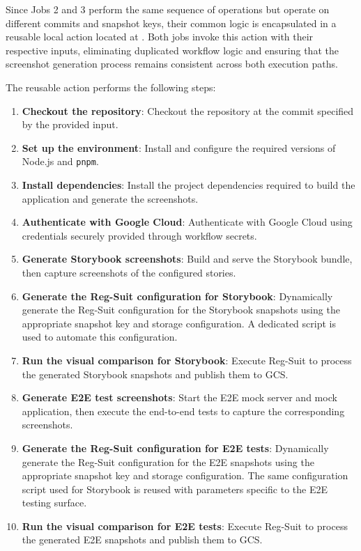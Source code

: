 Since Jobs 2 and 3 perform the same sequence of operations but operate on different commits and snapshot keys, their common logic is encapsulated in a reusable local action located at . Both jobs invoke this action with their respective inputs, eliminating duplicated workflow logic and ensuring that the screenshot generation process remains consistent across both execution paths.

The reusable action performs the following steps:

\begin{enumerate}
    \item \textbf{Checkout the repository}: Checkout the repository at the commit specified by the provided input.

    \item \textbf{Set up the environment}: Install and configure the required versions of Node.js and \texttt{pnpm}.

    \item \textbf{Install dependencies}: Install the project dependencies required to build the application and generate the screenshots.

    \item \textbf{Authenticate with Google Cloud}: Authenticate with Google Cloud using credentials securely provided through workflow secrets.

    \item \textbf{Generate Storybook screenshots}: Build and serve the Storybook bundle, then capture screenshots of the configured stories.

    \item \textbf{Generate the Reg-Suit configuration for Storybook}: Dynamically generate the Reg-Suit configuration for the Storybook snapshots using the appropriate snapshot key and storage configuration. A dedicated script is used to automate this configuration.

    \item \textbf{Run the visual comparison for Storybook}: Execute Reg-Suit to process the generated Storybook snapshots and publish them to \ac{GCS}.

    \item \textbf{Generate E2E test screenshots}: Start the E2E mock server and mock application, then execute the end-to-end tests to capture the corresponding screenshots.

    \item \textbf{Generate the Reg-Suit configuration for E2E tests}: Dynamically generate the Reg-Suit configuration for the E2E snapshots using the appropriate snapshot key and storage configuration. The same configuration script used for Storybook is reused with parameters specific to the E2E testing surface.

    \item \textbf{Run the visual comparison for E2E tests}: Execute Reg-Suit to process the generated E2E snapshots and publish them to \ac{GCS}.
\end{enumerate}


